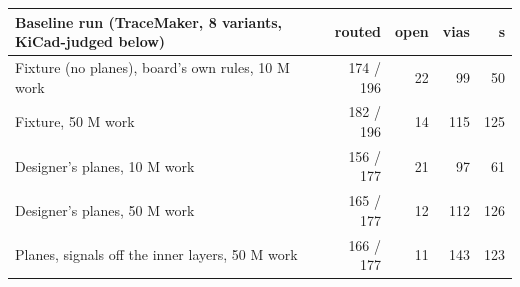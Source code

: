 \begin{tabular}{lrrrr}
\toprule
Baseline run (TraceMaker, 8 variants, KiCad-judged below) & routed & open & vias & s \\
\midrule
Fixture (no planes), board's own rules, 10 M work & 174 / 196 & 22 & 99 & 50 \\
Fixture, 50 M work & 182 / 196 & 14 & 115 & 125 \\
Designer's planes, 10 M work & 156 / 177 & 21 & 97 & 61 \\
Designer's planes, 50 M work & 165 / 177 & 12 & 112 & 126 \\
Planes, signals off the inner layers, 50 M work & 166 / 177 & 11 & 143 & 123 \\
\bottomrule
\end{tabular}
